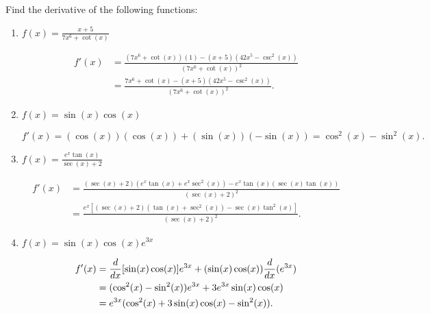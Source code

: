 \documentclass[nooutcomes,handout]{ximera}
\begin{document}
\begin{problem}
Find the derivative of the following functions:

	\begin{enumerate}
	
	\item  $f(x) = \frac{x+5}{7x^6 + \cot(x)}$
			\begin{freeResponse}
			\begin{align*}
			f'(x) &= \frac{(7x^6 + \cot(x))(1) - (x+5)(42x^5 - \csc^2(x))}{(7x^6 + \cot(x))^2}  \\
			&= \frac{7x^6 + \cot(x) - (x+5)(42x^5 - \csc^2(x))}{(7x^6 + \cot(x))^2}.
			\end{align*}
			\end{freeResponse}
			
			
			
	\item  $f(x) = \sin(x) \cos(x)$
			\begin{freeResponse}
			$$f'(x) = (\cos(x))(\cos(x)) + (\sin(x))(-\sin(x)) = \cos^2(x) - \sin^2(x).$$
			\end{freeResponse}
			
			
			
	\item  $f(x) = \frac{e^x \tan(x)}{\sec(x) + 2}$
			\begin{freeResponse}
			\begin{align*}
			f'(x) &= \frac{(\sec(x)+2)(e^x \tan(x) + e^x \sec^2(x)) - e^x \tan(x) (\sec(x) \tan(x))}{(\sec(x) + 2)^2}  \\
			&= \frac{e^x[(\sec(x) + 2)(\tan(x) + \sec^2(x)) - \sec(x) \tan^2(x)]}{(\sec(x) + 2)^2}.
			\end{align*}
			\end{freeResponse}
			
			
			
	\item  $f(x) = \sin(x) \cos(x) e^{3x}$
			\begin{freeResponse}
			\begin{align*}
			f'(x) &= \frac{d}{dx}[\sin(x) \cos(x)] e^{3x} + (\sin(x) \cos(x)) \frac{d}{dx}(e^{3x})  \\
			&= (\cos^2(x) - \sin^2(x))e^{3x} + 3e^{3x} \sin(x) \cos(x)  \\
			&= e^{3x}(\cos^2(x) + 3\sin(x) \cos(x) - \sin^2(x)).
			\end{align*}
			\end{freeResponse}
			
			
			
	\end{enumerate}
		
\end{problem}	
\end{document}
